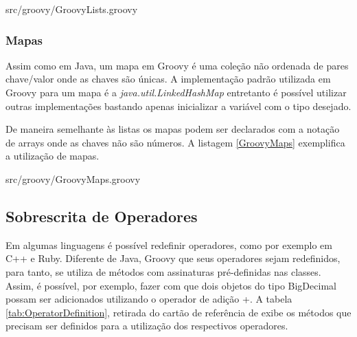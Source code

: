 \documentclass[12pt]{article}
\begin{document}
    
                    {src/groovy/GroovyLists.groovy}

\subsubsection{Mapas}

    Assim como em Java, um mapa em Groovy é uma coleção não ordenada de pares 
    chave/valor onde as chaves são únicas. A implementação padrão utilizada em 
    Groovy para um mapa é a \emph{java.util.LinkedHashMap} entretanto é possível
    utilizar outras implementações bastando apenas inicializar a variável com o 
    tipo desejado.
    
    De maneira semelhante às listas os mapas podem ser declarados com a notação
    de arrays onde as chaves não são números. A listagem \ref{GroovyMaps} exemplifica
    a utilização de mapas.
    
    
                    {src/groovy/GroovyMaps.groovy}
    
\subsection{Sobrescrita de Operadores}  
    
    Em algumas linguagens é possível redefinir operadores, como por exemplo em 
    C++ e Ruby. Diferente de Java, Groovy que seus operadores sejam redefinidos,
    para tanto, se utiliza de métodos com assinaturas pré-definidas nas classes.
    Assim, é possível, por exemplo, fazer com que dois objetos do tipo BigDecimal
    possam ser adicionados utilizando o operador de adição +. A tabela 
    \ref{tab:OperatorDefinition}, retirada do cartão de referência de \cite{rfcard} 
    exibe os métodos que precisam ser definidos para a utilização dos respectivos 
    operadores.
\end{document}
